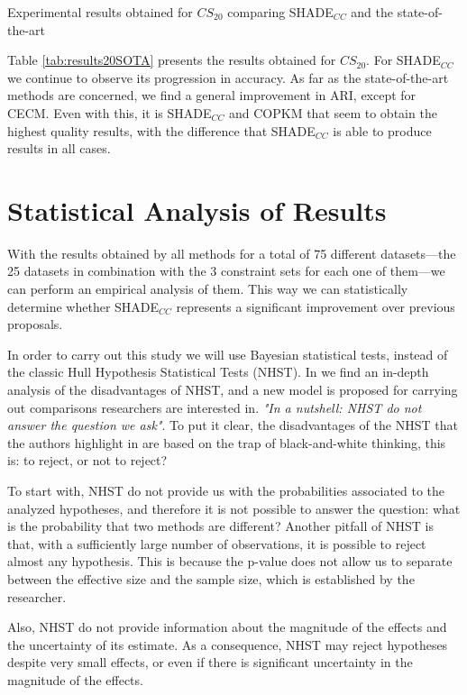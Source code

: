 \documentclass[review]{elsarticle}
\begin{document}
\begin{table}[!h]
	\caption{Experimental results obtained for $CS_{20}$ comparing SHADE$_{CC}$ and the state-of-the-art}
	\label{tab:results20SOTA}
\end{table}

Table \ref{tab:results20SOTA} presents the results obtained for $CS_{20}$. For SHADE$_{CC}$ we continue to observe its progression in accuracy. As far as the state-of-the-art methods are concerned, we find a general improvement in ARI, except for CECM. Even with this, it is SHADE$_{CC}$ and COPKM that seem to obtain the highest quality results, with the difference that SHADE$_{CC}$ is able to produce results in all cases.

\clearpage

\section{Statistical Analysis of Results} \label{sec:analisis}

With the results obtained by all methods for a total of 75 different datasets---the 25 datasets in combination with the 3 constraint sets for each one of them---we can perform an empirical analysis of them. This way we can statistically determine whether SHADE$_{CC}$ represents a significant improvement over previous proposals.

In order to carry out this study we will use Bayesian statistical tests, instead of the classic Hull Hypothesis Statistical Tests (NHST). In \cite{benavoli2017time} we find an in-depth analysis of the disadvantages of NHST, and a new model is proposed for carrying out comparisons researchers are interested in. \textit{"In a nutshell: NHST do not answer the question we ask"}. To put it clear, the disadvantages of the NHST that the authors highlight in \cite{benavoli2017time} are based on the trap of black-and-white thinking, this is: to reject, or not to reject?

To start with, NHST do not provide us with the probabilities associated to the analyzed hypotheses, and therefore it is not possible to answer the question: what is the probability that two methods are different? Another pitfall of NHST is that, with a sufficiently large number of observations, it is possible to reject almost any hypothesis. This is because the p-value does not allow us to separate between the effective size and the sample size, which is established by the researcher.

Also, NHST do not provide information about the magnitude of the effects and the uncertainty of its estimate. As a consequence, NHST may reject hypotheses despite very small effects, or even if there is significant uncertainty in the magnitude of the effects.
\end{document}
